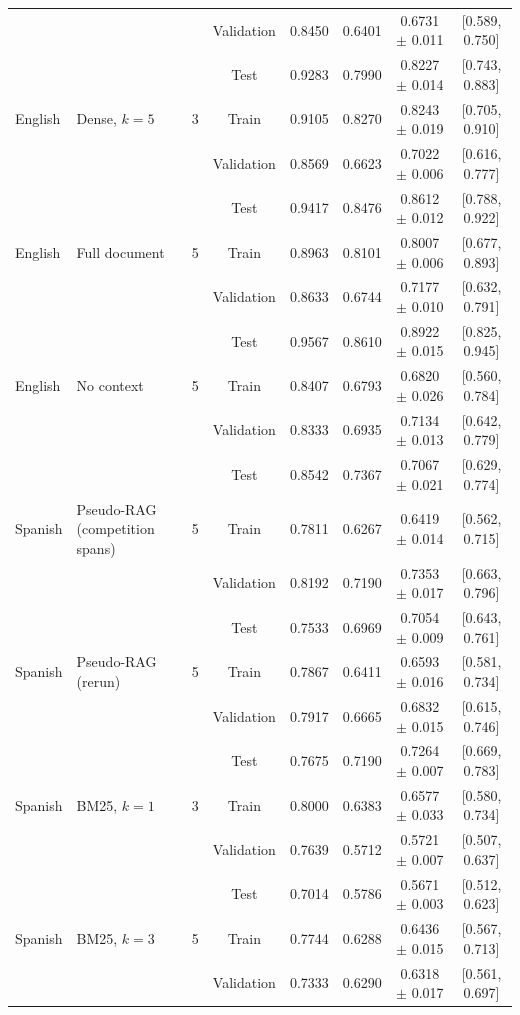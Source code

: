 \begin{tabular}{llcccccc}
 & &  & Validation & 0.8450 & 0.6401 & 0.6731 $\pm$ 0.011 & [0.589, 0.750] \\
 & &  & Test & 0.9283 & 0.7990 & 0.8227 $\pm$ 0.014 & [0.743, 0.883] \\
English & Dense, $k=5$ & 3 & Train & 0.9105 & 0.8270 & 0.8243 $\pm$ 0.019 & [0.705, 0.910] \\
 & &  & Validation & 0.8569 & 0.6623 & 0.7022 $\pm$ 0.006 & [0.616, 0.777] \\
 & &  & Test & 0.9417 & 0.8476 & 0.8612 $\pm$ 0.012 & [0.788, 0.922] \\
English & Full document & 5 & Train & 0.8963 & 0.8101 & 0.8007 $\pm$ 0.006 & [0.677, 0.893] \\
 & &  & Validation & 0.8633 & 0.6744 & 0.7177 $\pm$ 0.010 & [0.632, 0.791] \\
 & &  & Test & 0.9567 & 0.8610 & 0.8922 $\pm$ 0.015 & [0.825, 0.945] \\
English & No context & 5 & Train & 0.8407 & 0.6793 & 0.6820 $\pm$ 0.026 & [0.560, 0.784] \\
 & &  & Validation & 0.8333 & 0.6935 & 0.7134 $\pm$ 0.013 & [0.642, 0.779] \\
 & &  & Test & 0.8542 & 0.7367 & 0.7067 $\pm$ 0.021 & [0.629, 0.774] \\
\hline
Spanish & Pseudo-RAG (competition spans) & 5 & Train & 0.7811 & 0.6267 & 0.6419 $\pm$ 0.014 & [0.562, 0.715] \\
 & &  & Validation & 0.8192 & 0.7190 & 0.7353 $\pm$ 0.017 & [0.663, 0.796] \\
 & &  & Test & 0.7533 & 0.6969 & 0.7054 $\pm$ 0.009 & [0.643, 0.761] \\
Spanish & Pseudo-RAG (rerun) & 5 & Train & 0.7867 & 0.6411 & 0.6593 $\pm$ 0.016 & [0.581, 0.734] \\
 & &  & Validation & 0.7917 & 0.6665 & 0.6832 $\pm$ 0.015 & [0.615, 0.746] \\
 & &  & Test & 0.7675 & 0.7190 & 0.7264 $\pm$ 0.007 & [0.669, 0.783] \\
Spanish & BM25, $k=1$ & 3 & Train & 0.8000 & 0.6383 & 0.6577 $\pm$ 0.033 & [0.580, 0.734] \\
 & &  & Validation & 0.7639 & 0.5712 & 0.5721 $\pm$ 0.007 & [0.507, 0.637] \\
 & &  & Test & 0.7014 & 0.5786 & 0.5671 $\pm$ 0.003 & [0.512, 0.623] \\
Spanish & BM25, $k=3$ & 5 & Train & 0.7744 & 0.6288 & 0.6436 $\pm$ 0.015 & [0.567, 0.713] \\
 & &  & Validation & 0.7333 & 0.6290 & 0.6318 $\pm$ 0.017 & [0.561, 0.697] \\

\end{tabular}
